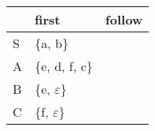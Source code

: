 \documentclass{standalone}
\providecommand\lightrule{%
	\arrayrulecolor{black!30}%
	\midrule[\lightrulewidth]%
	\arrayrulecolor{black}}
\begin{document}
\begin{tabularx}{\textwidth}{XXX}
    & first & follow\\
    \midrule
        S
        &
        \{a, b\} %
        &
        \\ \lightrule
        A
        &
        \{e, d, f, c\} %
        &
        \\ \lightrule
        B
        &
        \{e, \(\varepsilon\)\} %
        &
        \\ \lightrule
        C
        &
        \{f, \(\varepsilon\)\} %
        &
\end{tabularx}
\end{document}
